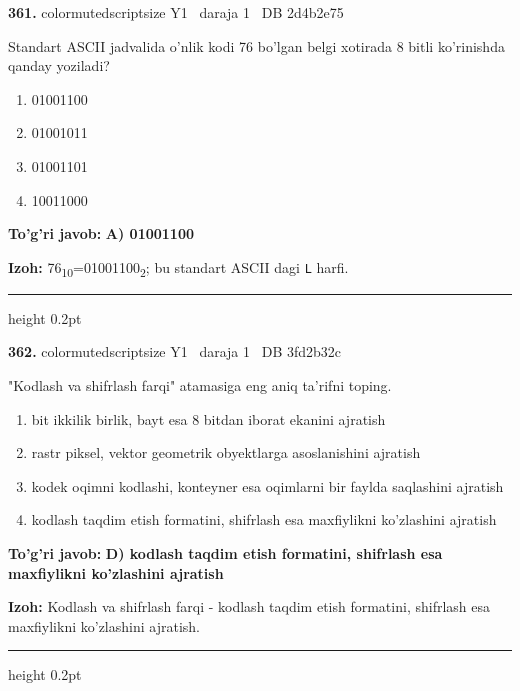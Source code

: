 \documentclass[10pt,a4paper,oneside]{article}
\begin{document}
\noindent\textbf{\color{ink}361.}  {color{muted}scriptsize Y1 \textbullet\ daraja 1 \textbullet\ DB 2d4b2e75}
\par
Standart ASCII jadvalida o'nlik kodi 76 bo'lgan belgi xotirada 8 bitli ko'rinishda qanday yoziladi?
\begin{enumerate}[label=\Alph*),leftmargin=9mm]
\item 01001100
\item 01001011
\item 01001101
\item 10011000
\end{enumerate}
\begin{tcolorbox}[enhanced,breakable,colback=teal!4,colframe=teal!50!black,boxrule=0.5pt,arc=1.1mm,left=3mm,right=3mm,top=1.7mm,bottom=1.7mm,before skip=2mm,after skip=2mm]
\textbf{\color{teal}To'g'ri javob:} \textbf{A) 01001100}
\par\smallskip
\textbf{Izoh:} 76\textsubscript{1}\textsubscript{0}=01001100\textsubscript{2}; bu standart ASCII dagi \texttt{L} harfi.
\end{tcolorbox}
\vspace{2mm}\hrule height 0.2pt \vspace{3mm}

\noindent\textbf{\color{ink}362.}  {color{muted}scriptsize Y1 \textbullet\ daraja 1 \textbullet\ DB 3fd2b32c}
\par
"Kodlash va shifrlash farqi" atamasiga eng aniq ta'rifni toping.
\begin{enumerate}[label=\Alph*),leftmargin=9mm]
\item bit ikkilik birlik, bayt esa 8 bitdan iborat ekanini ajratish
\item rastr piksel, vektor geometrik obyektlarga asoslanishini ajratish
\item kodek oqimni kodlashi, konteyner esa oqimlarni bir faylda saqlashini ajratish
\item kodlash taqdim etish formatini, shifrlash esa maxfiylikni ko'zlashini ajratish
\end{enumerate}
\begin{tcolorbox}[enhanced,breakable,colback=teal!4,colframe=teal!50!black,boxrule=0.5pt,arc=1.1mm,left=3mm,right=3mm,top=1.7mm,bottom=1.7mm,before skip=2mm,after skip=2mm]
\textbf{\color{teal}To'g'ri javob:} \textbf{D) kodlash taqdim etish formatini, shifrlash esa maxfiylikni ko'zlashini ajratish}
\par\smallskip
\textbf{Izoh:} Kodlash va shifrlash farqi - kodlash taqdim etish formatini, shifrlash esa maxfiylikni ko'zlashini ajratish.
\end{tcolorbox}
\vspace{2mm}\hrule height 0.2pt \vspace{3mm}
\end{document}
